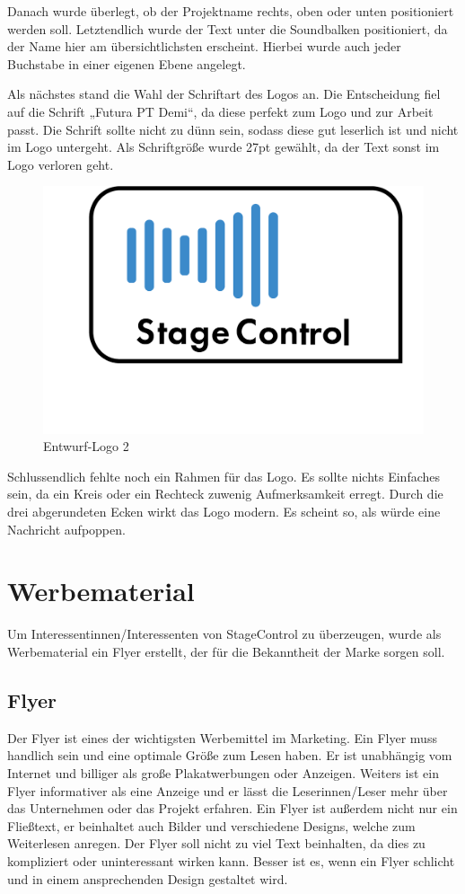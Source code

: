 Danach wurde überlegt, ob der Projektname rechts, oben oder unten positioniert werden soll. Letztendlich wurde der Text unter die Soundbalken positioniert, da der Name hier am übersichtlichsten erscheint. Hierbei wurde auch jeder Buchstabe in einer eigenen Ebene angelegt. 

\newpage
Als nächstes stand die Wahl der Schriftart des Logos an. Die Entscheidung fiel auf die Schrift „Futura PT Demi“, da diese perfekt zum Logo und zur Arbeit passt. Die Schrift sollte nicht zu dünn sein, sodass diese gut leserlich ist und nicht im Logo untergeht. Als Schriftgröße wurde 27pt gewählt, da der Text sonst im Logo verloren geht. 

\begin{figure}[H]
	\centering
	\includegraphics[width=0.5\linewidth]{images/Logo-Entwurf.png}
	\caption[Entwurf-Logo]{Entwurf-Logo 2}
	\label{fig:Entwurf-Logo2}
\end{figure}

Schlussendlich fehlte noch ein Rahmen für das Logo. Es sollte nichts Einfaches sein, da ein Kreis oder ein Rechteck zuwenig Aufmerksamkeit erregt. Durch die drei abgerundeten Ecken  wirkt das Logo modern. Es scheint so, als würde eine Nachricht aufpoppen. 

\section{Werbematerial}
Um Interessentinnen/Interessenten von StageControl zu überzeugen, wurde als Werbematerial ein Flyer erstellt, der für die Bekanntheit der Marke sorgen soll.

\subsection{Flyer}
Der Flyer ist eines der wichtigsten Werbemittel im Marketing. Ein Flyer muss handlich sein und eine optimale Größe zum Lesen haben. Er ist unabhängig vom Internet und billiger als große Plakatwerbungen oder Anzeigen. Weiters ist ein Flyer informativer als eine Anzeige und er lässt die Leserinnen/Leser mehr über das Unternehmen oder das Projekt erfahren. Ein Flyer ist außerdem nicht nur ein Fließtext, er beinhaltet auch Bilder und verschiedene Designs, welche zum Weiterlesen anregen. Der Flyer soll nicht zu viel Text beinhalten, da dies zu kompliziert oder uninteressant wirken kann. Besser ist es, wenn ein Flyer schlicht und in einem ansprechenden Design gestaltet wird. \parencite{VorteilevonFlyern}

